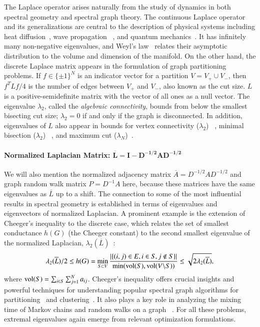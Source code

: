 The Laplace operator arises naturally from the study of dynamics in both
spectral geometry and spectral graph theory. The continuous Laplace operator
and its generalizations are central to the description of physical systems
including heat diffusion~\cite{mckean1972selberg}, wave propagation~
\cite{levy2006laplace}, and quantum mechanics~\cite{ducastelle1970moments}. It
has infinitely many non-negative eigenvalues, and Weyl's law~
\cite{weyl1911asymptotische} relates their asymptotic distribution to the volume
and dimension of the manifold. On the other hand, the discrete Laplace matrix
appears in the formulation of graph partitioning problems. If $f \in \{ \pm 1
\}^N$ is an indicator vector for a partition $V = V_+ \cup V_-$, then $f^T L
f/4$ is the number of edges between $V_+$ and $V_{-}$, also known as the cut
size. $L$ is a positive-semidefinite matrix with the vector of all ones as a
null vector. The eigenvalue $\lambda_2$, called the {\em algebraic
connectivity}, bounds from below the smallest bisecting cut size; $\lambda_2 =
0$ if and only if the graph is disconnected. In addition, eigenvalues of $L$
also appear in bounds for vertex connectivity ($\lambda_2$)~
\cite{cvetkovic2009introduction}, minimal bisection ($\lambda_2$)~
\cite{donath2003lower}, and maximum cut ($\lambda_N$)~\cite{trevisan2012max}.

\paragraph{Normalized Laplacian Matrix: $\pmb{\overline{L} = I - D^{-1/2}AD^
{-1/2}}$}

We will also mention the normalized adjacency matrix $\overline{A} =
D^{-1/2}AD^{-1/2}$ and graph random walk matrix $P = D^{-1}A$ here, because
these matrices have the same eigenvalues as $\bar{L}$ up to a shift. The
connection to some of the most influential results in spectral geometry is
established in terms of eigenvalues and eigenvectors of normalized Laplacian. A
prominent example is the extension of Cheeger's inequality to the discrete
case, which relates the set of smallest conductance $h(G)$ (the Cheeger
constant)  to the second smallest eigenvalue of the normalized Laplacian,
$\lambda_2(\overline{L})$~\cite{montenegro2006mathematical}:
\begin{equation}\label{eqn:cheeger}
  \lambda_2(\overline{L})/2\leq h(G) = \min_{S\subset V}\frac{\left\lvert\{(i,j)\in
  E, i\in S, j\notin S\}\right\rvert}{\min(\text{vol}(S), \text{vol}(V\backslash S))} \leq 
  \sqrt{2\lambda_2(\overline{L})} ,
\end{equation}
where $\operatorname{vol}(S) = \sum_{i \in S}\sum_{j=1}^{N}a_{ij}$. Cheeger's inequality
offers crucial insights and powerful techniques for understanding popular
spectral graph algorithms for partitioning~\cite{mcsherry2001spectral} and
clustering~\cite{ng2002spectral}. It also plays a key role in analyzing the
mixing time of Markov chains and random walks on a graph
~\cite{Mihail-1989-Markov,Sinclair-1989-Markov}. For all these problems,
extremal eigenvalues again emerge from relevant optimization formulations.

